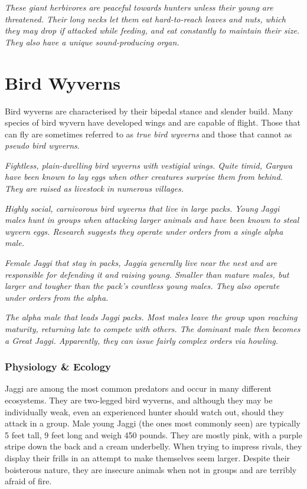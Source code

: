 \textit{These giant herbivores are peaceful towards hunters unless their young are threatened. Their long necks let them eat hard-to-reach leaves and nuts, which they may drop if attacked while feeding, and eat constantly to maintain their size. They also have a unique sound-producing organ.}

\section{Bird Wyverns}
Bird wyverns are characterised by their bipedal stance and slender build. Many species of bird wyvern have developed wings and are capable of flight. Those that can fly are sometimes referred to as \emph{true bird wyverns} and those that cannot as \emph{pseudo bird wyverns}.

\textit{Fightless, plain-dwelling bird wyverns with vestigial wings. Quite timid, Gargwa have been known to lay eggs when other creatures surprise them from behind. They are raised as livestock in numerous villages.}

\textit{Highly social, carnivorous bird wyverns that live in large packs. Young Jaggi males hunt in groups when attacking larger animals and have been known to steal wyvern eggs. Research suggests they operate under orders from a single alpha male.}

\textit{Female Jaggi that stay in packs, Jaggia generally live near the nest and are responsible for defending it and raising young. Smaller than mature males, but larger and tougher than the pack's countless young males. They also operate under orders from the alpha.}

\textit{The alpha male that leads Jaggi packs. Most males leave the group upon reaching maturity, returning late to compete with others. The dominant male then becomes a Great Jaggi. Apparently, they can issue fairly complex orders via howling.}

\subsubsection{Physiology \& Ecology}
Jaggi are among the most common predators and occur in many different ecosystems. They are two-legged bird wyverns, and although they may be individually weak, even an experienced hunter should watch out, should they attack in a group. Male young Jaggi (the ones most commonly seen) are typically 5 feet tall, 9 feet long and weigh 450 pounds. They are mostly pink, with a purple stripe down the back and a cream underbelly. When trying to impress rivals, they display their frills in an attempt to make themselves seem larger. Despite their boisterous nature, they are insecure animals when not in groups and are terribly afraid of fire.

